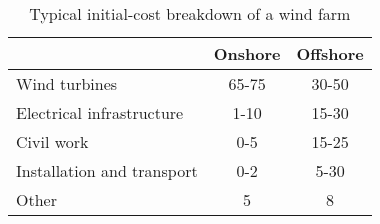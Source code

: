 \begin{table}
\label{tab:typicalcost}

\begin{tabular}{lcc}
\hline 
 & Onshore & Offshore \\ 
\hline 
Wind turbines & 65-75 & 30-50 \\ 
Electrical infrastructure & 1-10 & 15-30 \\ 
Civil work & 0-5 & 15-25 \\ 
Installation and transport & 0-2 & 5-30 \\ 
Other & 5 & 8 \\ 
\hline 
\end{tabular}
\caption{Typical initial-cost breakdown of a wind farm}%
\end{table}



